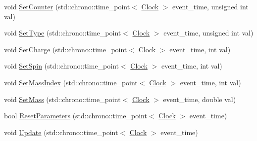 \begin{DoxyCompactItemize}
\item 
void \mbox{\hyperlink{classElementaryParticle_a141316fd968cce8ecc5aa11ce0757d63}{Set\+Counter}} (std\+::chrono\+::time\+\_\+point$<$ \mbox{\hyperlink{universe_8h_a0ef8d951d1ca5ab3cfaf7ab4c7a6fd80}{Clock}} $>$ event\+\_\+time, unsigned int val)
\item 
void \mbox{\hyperlink{classElementaryParticle_a37d7718faf6be68d4374bcc56816f30a}{Set\+Type}} (std\+::chrono\+::time\+\_\+point$<$ \mbox{\hyperlink{universe_8h_a0ef8d951d1ca5ab3cfaf7ab4c7a6fd80}{Clock}} $>$ event\+\_\+time, unsigned int val)
\item 
void \mbox{\hyperlink{classElementaryParticle_abbc6d3c58509c4121df55bfef716d2f1}{Set\+Charge}} (std\+::chrono\+::time\+\_\+point$<$ \mbox{\hyperlink{universe_8h_a0ef8d951d1ca5ab3cfaf7ab4c7a6fd80}{Clock}} $>$ event\+\_\+time, int val)
\item 
void \mbox{\hyperlink{classElementaryParticle_a437fa86d88157314b84662b158d52353}{Set\+Spin}} (std\+::chrono\+::time\+\_\+point$<$ \mbox{\hyperlink{universe_8h_a0ef8d951d1ca5ab3cfaf7ab4c7a6fd80}{Clock}} $>$ event\+\_\+time, int val)
\item 
void \mbox{\hyperlink{classElementaryParticle_a8a3b91409772f4091a782624a34024e7}{Set\+Mass\+Index}} (std\+::chrono\+::time\+\_\+point$<$ \mbox{\hyperlink{universe_8h_a0ef8d951d1ca5ab3cfaf7ab4c7a6fd80}{Clock}} $>$ event\+\_\+time, int val)
\item 
void \mbox{\hyperlink{classElementaryParticle_a778ff8188ecb369e533521ed4f94b034}{Set\+Mass}} (std\+::chrono\+::time\+\_\+point$<$ \mbox{\hyperlink{universe_8h_a0ef8d951d1ca5ab3cfaf7ab4c7a6fd80}{Clock}} $>$ event\+\_\+time, double val)
\item 
bool \mbox{\hyperlink{classElementaryParticle_ac0f85f34bdfc1d42324201eb7c38e85e}{Reset\+Parameters}} (std\+::chrono\+::time\+\_\+point$<$ \mbox{\hyperlink{universe_8h_a0ef8d951d1ca5ab3cfaf7ab4c7a6fd80}{Clock}} $>$ event\+\_\+time)
\item 
void \mbox{\hyperlink{classElementaryParticle_af37afad11f5602f1a943b6e88a728b07}{Update}} (std\+::chrono\+::time\+\_\+point$<$ \mbox{\hyperlink{universe_8h_a0ef8d951d1ca5ab3cfaf7ab4c7a6fd80}{Clock}} $>$ event\+\_\+time)
\end{DoxyCompactItemize}
